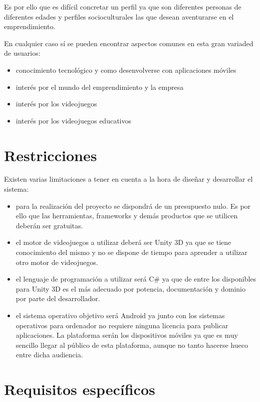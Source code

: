 Es por ello que es difícil concretar un perfil ya que son diferentes personas de diferentes edades y perfiles socioculturales las que desean aventurarse en el emprendimiento.

En cualquier caso sí se pueden encontrar aspectos comunes en esta gran variaded de usuarios:

\begin{itemize}

\item conocimiento tecnológico y como desenvolverse con aplicaciones móviles
\item interés por el mundo del emprendimiento y la empresa
\item interés por los videojuegos
\item interés por los videojuegos educativos

\end{itemize}

\section{Restricciones}

Existen varias limitaciones a tener en cuenta a la hora de diseñar y desarrollar el sistema:

\begin{itemize}

\item para la realización del proyecto se dispondrá de un presupuesto nulo. Es por ello que las herramientas, frameworks y demás productos que se utilicen deberán ser gratuitas.
\item el motor de videojuegos a utilizar deberá ser Unity 3D ya que se tiene conocimiento del mismo y no se dispone de tiempo para aprender a utilizar otro motor de videojuegos.
\item el lenguaje de programación a utilizar será C\# ya que de entre los disponibles para Unity 3D es el más adecuado por potencia, documentación y dominio por parte del desarrollador.
\item el sistema operativo objetivo será Android ya junto con los sistemas operativos para ordenador no requiere ninguna licencia para publicar aplicaciones. La plataforma serán los dispositivos móviles ya que es muy sencillo llegar al público de esta plataforma, aunque no tanto hacerse hueco entre dicha audiencia.

\end{itemize}

\section{Requisitos específicos}


